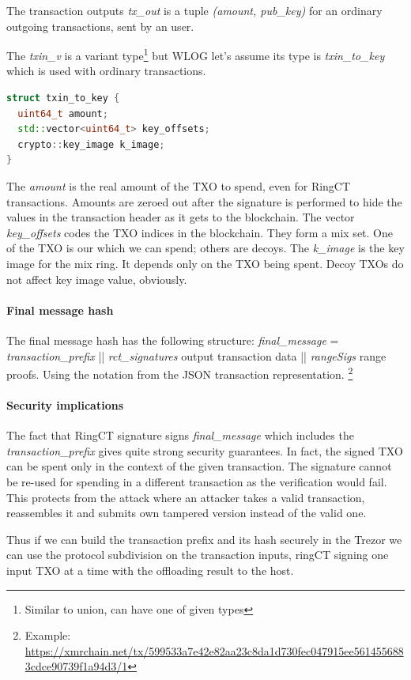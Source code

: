 \documentclass[]{article}
\begin{document}
The transaction outputs \emph{tx\_out} is a tuple \emph{(amount, pub\_key)} for an ordinary outgoing transactions, sent by an user. 

The \emph{txin\_v} is a variant type\footnote{Similar to union, can have one of given types} but WLOG let's assume its type is \emph{txin\_to\_key} which is used with ordinary transactions. 

\begin{lstlisting}[language=c++]
struct txin_to_key {
  uint64_t amount;
  std::vector<uint64_t> key_offsets;
  crypto::key_image k_image;
}
\end{lstlisting}

The \emph{amount} is the real amount of the TXO to spend, even for RingCT transactions. Amounts are zeroed out after the signature is performed to hide the values in the transaction header as it gets to the blockchain.
The vector \emph{key\_offsets} codes the TXO indices in the blockchain. They form a mix set. One of the TXO is our which we can spend; others are decoys.
The \emph{k\_image} is the key image for the mix ring. It depends only on the TXO being spent. Decoy TXOs do not affect key image value, obviously.

\paragraph{Final message hash} The final message hash has the following structure: \emph{final\_message} = \emph{transaction\_prefix} || \emph{rct\_signatures} output transaction data || \emph{rangeSigs} range proofs. Using the notation from the JSON transaction representation. \footnote{Example: \url{https://xmrchain.net/tx/599533a7e42e82aa23c8da1d730fec047915ee5614556883cdce90739f1a94d3/1}}

\paragraph{Security implications}
The fact that RingCT signature signs \emph{final\_message} which includes the \emph{transaction\_prefix} gives quite strong security guarantees. In fact, the signed TXO can be spent only in the context of the given transaction. The signature cannot be re-used for spending in a different transaction as the verification would fail. This protects from the attack where an attacker takes a valid transaction, reassembles it and submits own tampered version instead of the valid one.

Thus if we can build the transaction prefix and its hash securely in the Trezor we can use the protocol subdivision on the transaction inputs, ringCT signing one input TXO at a time with the offloading result to the host. 
\end{document}

